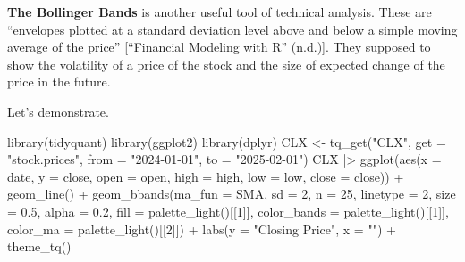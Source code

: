 \documentclass[
  letterpaper,
  DIV=11,
  numbers=noendperiod]{scrartcl}
\newenvironment{Shaded}{\begin{snugshade}}{\end{snugshade}}
\newcommand{\BuiltInTok}[1]{\textcolor[rgb]{0.00,0.23,0.31}{#1}}
\newcommand{\DecValTok}[1]{\textcolor[rgb]{0.68,0.00,0.00}{#1}}
\newcommand{\FloatTok}[1]{\textcolor[rgb]{0.68,0.00,0.00}{#1}}
\newcommand{\ImportTok}[1]{\textcolor[rgb]{0.00,0.46,0.62}{#1}}
\newcommand{\NormalTok}[1]{\textcolor[rgb]{0.00,0.23,0.31}{#1}}
\newcommand{\OperatorTok}[1]{\textcolor[rgb]{0.37,0.37,0.37}{#1}}
\newcommand{\StringTok}[1]{\textcolor[rgb]{0.13,0.47,0.30}{#1}}
\begin{document}
\textbf{The Bollinger Bands} is another useful tool of technical
analysis. These are ``envelopes plotted at a standard deviation level
above and below a simple moving average of the price'' {[}{``Financial
Modeling with {R}''} (n.d.){]}. They supposed to show the volatility of
a price of the stock and the size of expected change of the price in the
future.

Let's demonstrate.

\begin{Shaded}
\begin{Highlighting}[]
\NormalTok{library(tidyquant)}
\NormalTok{library(ggplot2)}
\NormalTok{library(dplyr)}
\NormalTok{CLX }\OperatorTok{\textless{}{-}}\NormalTok{ tq\_get(}\StringTok{"CLX"}\NormalTok{, get }\OperatorTok{=} \StringTok{"stock.prices"}\NormalTok{, }\ImportTok{from} \OperatorTok{=} \StringTok{"2024{-}01{-}01"}\NormalTok{, }
\NormalTok{               to }\OperatorTok{=} \StringTok{"2025{-}02{-}01"}\NormalTok{)}
\NormalTok{CLX }\OperatorTok{|\textgreater{}}
\NormalTok{  ggplot(aes(x }\OperatorTok{=}\NormalTok{ date, y }\OperatorTok{=}\NormalTok{ close, }\BuiltInTok{open} \OperatorTok{=} \BuiltInTok{open}\NormalTok{,}
\NormalTok{              high }\OperatorTok{=}\NormalTok{ high, low }\OperatorTok{=}\NormalTok{ low, close }\OperatorTok{=}\NormalTok{ close)) }\OperatorTok{+}
\NormalTok{    geom\_line() }\OperatorTok{+}
\NormalTok{    geom\_bbands(ma\_fun }\OperatorTok{=}\NormalTok{ SMA, sd }\OperatorTok{=} \DecValTok{2}\NormalTok{, n }\OperatorTok{=} \DecValTok{25}\NormalTok{,}
\NormalTok{                linetype }\OperatorTok{=} \DecValTok{2}\NormalTok{, size }\OperatorTok{=} \FloatTok{0.5}\NormalTok{, alpha }\OperatorTok{=} \FloatTok{0.2}\NormalTok{,}
\NormalTok{                fill        }\OperatorTok{=}\NormalTok{ palette\_light()[[}\DecValTok{1}\NormalTok{]],}
\NormalTok{                color\_bands }\OperatorTok{=}\NormalTok{ palette\_light()[[}\DecValTok{1}\NormalTok{]],}
\NormalTok{                color\_ma    }\OperatorTok{=}\NormalTok{ palette\_light()[[}\DecValTok{2}\NormalTok{]]) }\OperatorTok{+}
\NormalTok{    labs(y }\OperatorTok{=} \StringTok{"Closing Price"}\NormalTok{, x }\OperatorTok{=} \StringTok{""}\NormalTok{) }\OperatorTok{+}
\NormalTok{    theme\_tq()}
\end{Highlighting}
\end{Shaded}
\end{document}
